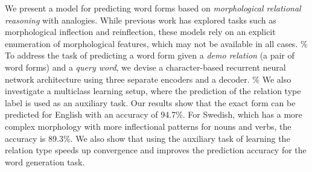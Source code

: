 We present a model for predicting word forms based on \emph{morphological relational reasoning} with analogies. While previous work has explored tasks such as morphological inflection and reinflection, these models rely on an explicit enumeration of morphological features, which may not be available in all cases. \% To address the task of predicting a word form given a \emph{demo relation} (a pair of word forms) and a \emph{query word}, we devise a character-based recurrent neural network architecture using three separate encoders and a decoder. \% We also investigate a multiclass learning setup, where the prediction of the relation type label is used as an auxiliary task. Our results show that the exact form can be predicted for English with an accuracy of 94.7\%. For Swedish, which has a more complex morphology with more inflectional patterns for nouns and verbs, the accuracy is 89.3\%. We also show that using the auxiliary task of learning the relation type speeds up convergence and improves the prediction accuracy for the word generation task.
